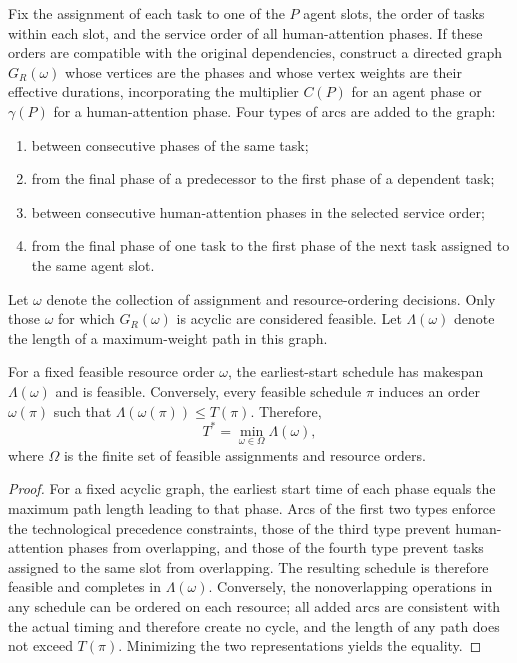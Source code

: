 \begin{definition}\label{def:resource-graph}
Fix the assignment of each task to one of the $P$ agent slots, the order of tasks within each slot, and the service order of all human-attention phases. If these orders are compatible with the original dependencies, construct a directed graph $G_R(\omega)$ whose vertices are the phases and whose vertex weights are their effective durations, incorporating the multiplier $C(P)$ for an agent phase or $\gamma(P)$ for a human-attention phase. Four types of arcs are added to the graph:
\begin{enumerate}
  \item between consecutive phases of the same task;
  \item from the final phase of a predecessor to the first phase of a dependent task;
  \item between consecutive human-attention phases in the selected service order;
  \item from the final phase of one task to the first phase of the next task assigned to the same agent slot.
\end{enumerate}
Let $\omega$ denote the collection of assignment and resource-ordering decisions. Only those $\omega$ for which $G_R(\omega)$ is acyclic are considered feasible. Let $\Lambda(\omega)$ denote the length of a maximum-weight path in this graph.
\end{definition}

\begin{proposition}\label{prop:resource-graph}
For a fixed feasible resource order $\omega$, the earliest-start schedule has makespan $\Lambda(\omega)$ and is feasible. Conversely, every feasible schedule $\pi$ induces an order $\omega(\pi)$ such that $\Lambda(\omega(\pi))\le T(\pi)$. Therefore,
\[
  T^{*}=\min_{\omega\in\Omega}\Lambda(\omega),
\]
where $\Omega$ is the finite set of feasible assignments and resource orders.
\end{proposition}

\begin{proof}
For a fixed acyclic graph, the earliest start time of each phase equals the maximum path length leading to that phase. Arcs of the first two types enforce the technological precedence constraints, those of the third type prevent human-attention phases from overlapping, and those of the fourth type prevent tasks assigned to the same slot from overlapping. The resulting schedule is therefore feasible and completes in $\Lambda(\omega)$. Conversely, the nonoverlapping operations in any schedule can be ordered on each resource; all added arcs are consistent with the actual timing and therefore create no cycle, and the length of any path does not exceed $T(\pi)$. Minimizing the two representations yields the equality.
\end{proof}

